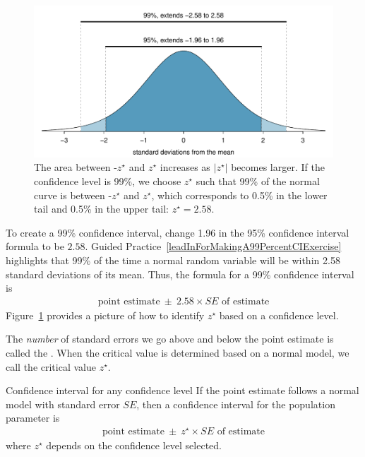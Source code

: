 \begin{figure}[ht]
\centering
\includegraphics[width=\textwidth]{ch_foundations_for_inf/figures/choosingZForCI/choosingZForCI}
\caption{The area between -$z^{\star}$ and $z^{\star}$ increases as $|z^{\star}|$ becomes larger. If the confidence level is 99\%, we choose $z^{\star}$ such that 99\% of the normal curve is between -$z^{\star}$ and $z^{\star}$, which corresponds to 0.5\% in the lower tail and 0.5\% in the upper tail: $z^{\star}=2.58$.}
\label{choosingZForCI}
\end{figure}


To create a 99\% confidence interval, change 1.96 in the 95\% confidence interval formula to be $2.58$. Guided Practice~\ref{leadInForMakingA99PercentCIExercise} highlights that 99\% of the time a normal random variable will be within 2.58 standard deviations of its mean. Thus, the formula for a 99\% confidence interval is
\begin{eqnarray}
\text{point estimate}\ \pm\ 2.58\times SE \text{ of estimate}
\label{99PercCIForMean}
\label{99PercCIForNormalPointEstimate}
\end{eqnarray}
Figure~\ref{choosingZForCI} provides a picture of how to identify $z^{\star}$ based on a confidence level. 

The \emph{number} of standard errors we go above and below the point estimate is called the .  When the critical value is determined based on a normal model, we call the critical value $z^{\star}$. 

\begin{onebox}{Confidence interval for any confidence level}
If the point estimate follows a normal model with standard error $SE$, then a confidence interval for the population parameter is
\begin{eqnarray*}
\text{point estimate}\ \pm\ z^{\star} \times SE \text{ of estimate}
\end{eqnarray*}
where $z^{\star}$ depends on the confidence level selected.\end{onebox}

